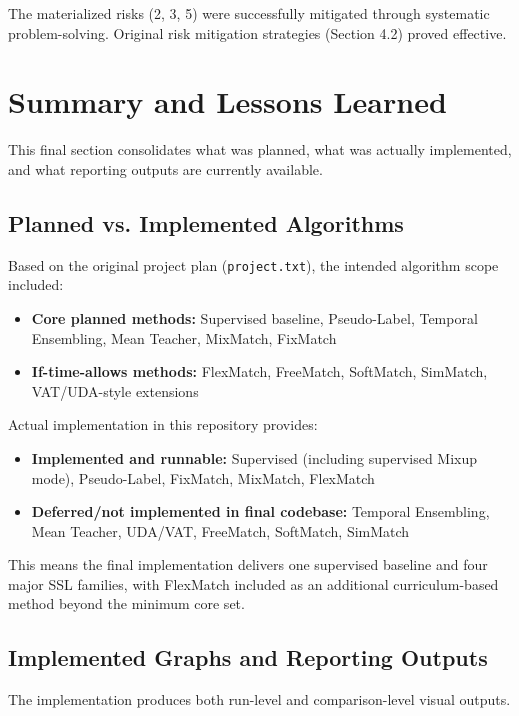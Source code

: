 The materialized risks (2, 3, 5) were successfully mitigated through systematic problem-solving. Original risk mitigation strategies (Section 4.2) proved effective.

\section{Summary and Lessons Learned}

This final section consolidates what was planned, what was actually implemented, and what reporting outputs are currently available.

\subsection{Planned vs. Implemented Algorithms}

Based on the original project plan (\texttt{project.txt}), the intended algorithm scope included:

\begin{itemize}
    \item \textbf{Core planned methods:} Supervised baseline, Pseudo-Label, Temporal Ensembling, Mean Teacher, MixMatch, FixMatch
    \item \textbf{If-time-allows methods:} FlexMatch, FreeMatch, SoftMatch, SimMatch, VAT/UDA-style extensions
\end{itemize}

Actual implementation in this repository provides:

\begin{itemize}
    \item \textbf{Implemented and runnable:} Supervised (including supervised Mixup mode), Pseudo-Label, FixMatch, MixMatch, FlexMatch
    \item \textbf{Deferred/not implemented in final codebase:} Temporal Ensembling, Mean Teacher, UDA/VAT, FreeMatch, SoftMatch, SimMatch
\end{itemize}

This means the final implementation delivers one supervised baseline and four major SSL families, with FlexMatch included as an additional curriculum-based method beyond the minimum core set.

\subsection{Implemented Graphs and Reporting Outputs}

The implementation produces both run-level and comparison-level visual outputs.

